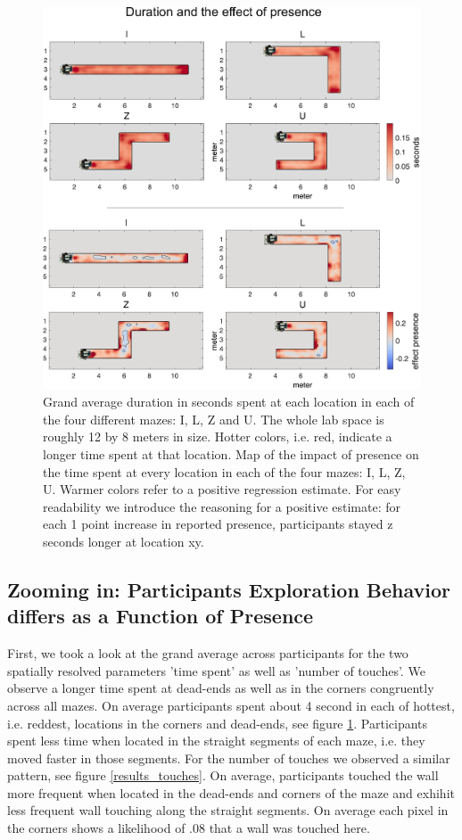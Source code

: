 \begin{figure}[ht]
\centering
\includegraphics[width=\linewidth]{figures/duration.pdf}
\vspace{0pt}
\caption{Grand average duration in seconds spent at each location in each of the four different mazes: I, L, Z and U. The whole lab space is roughly 12 by 8 meters in size. Hotter colors, i.e. red, indicate a longer time spent at that location. Map of the impact of presence on the time spent at every location in each of the four mazes: I, L, Z, U. Warmer colors refer to a positive regression estimate. For easy readability we introduce the reasoning for a positive estimate: for each 1 point increase in reported presence, participants stayed z seconds longer at location xy.}
\label{results_duration}
\end{figure}

\subsection{Zooming in: Participants Exploration Behavior differs as a Function of Presence} First, we took a look at the grand average across participants for the two spatially resolved parameters 'time spent' as well as 'number of touches'. We observe a longer time spent at dead-ends as well as in the corners congruently across all mazes. On average participants spent about 4 second in each of hottest, i.e. reddest, locations in the corners and dead-ends, see figure \ref{results_duration}. Participants spent less time when located in the straight segments of each maze, i.e. they moved faster in those segments. For the number of touches we observed a similar pattern, see figure \ref{results_touches}. On average, participants touched the wall more frequent when located in the dead-ends and corners of the maze and exhihit less frequent wall touching along the straight segments. On average each pixel in the corners shows a likelihood of .08 that a wall was touched here.

